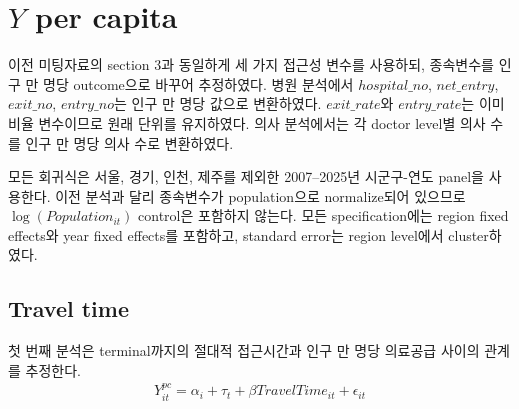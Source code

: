 \documentclass[a4paper, 10pt]{article}
\begin{document}
    \section{$Y$ per capita}
        이전 미팅자료의 section 3과 동일하게 세 가지 접근성 변수를 사용하되,
        종속변수를 인구 만 명당 outcome으로 바꾸어 추정하였다.
        병원 분석에서 $hospital\_no$, $net\_entry$, $exit\_no$,
        $entry\_no$는 인구 만 명당 값으로 변환하였다. $exit\_rate$와
        $entry\_rate$는 이미 비율 변수이므로 원래 단위를 유지하였다. 의사 분석에서는
        각 doctor level별 의사 수를 인구 만 명당 의사 수로 변환하였다.

        모든 회귀식은 서울, 경기, 인천, 제주를 제외한 2007--2025년 시군구-연도 panel을
        사용한다. 이전 분석과 달리 종속변수가 population으로 normalize되어 있으므로
        $\log(Population_{it})$ control은 포함하지 않는다. 모든 specification에는
        region fixed effects와 year fixed effects를 포함하고, standard error는 region
        level에서 cluster하였다.

        \subsection{Travel time}
            첫 번째 분석은 terminal까지의 절대적 접근시간과 인구 만 명당 의료공급 사이의
            관계를 추정한다.
            \begin{align*}
                Y^{pc}_{it}
                =
                \alpha_i + \tau_t
                + \beta TravelTime_{it}
                + \epsilon_{it}
            \end{align*}

            \begin{table}[H]
                \centering
                \caption{Per-Capita Outcome, Travel Time: 의원}
                
            \end{table}

            \begin{table}[H]
                \centering
                \caption{Per-Capita Outcome, Travel Time: 병원}
                
            \end{table}

            \begin{table}[H]
                \centering
                \caption{Per-Capita Outcome, Travel Time: 종합병원}
                
            \end{table}
\end{document}
